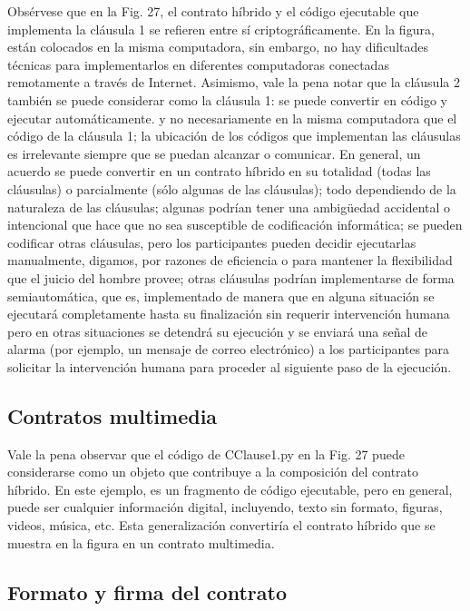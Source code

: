 \documentclass[12pt]{report} %
\begin{document}
\begin{itemize}
Obsérvese que en la Fig. 27, el contrato híbrido y el código ejecutable que implementa la cláusula 1 se refieren entre sí criptográficamente. En la figura, están colocados en la misma computadora, sin embargo, no hay dificultades técnicas para implementarlos en diferentes computadoras conectadas remotamente a través de Internet. Asimismo, vale la pena notar que la cláusula 2 también se puede considerar como la cláusula 1: se puede convertir en código y ejecutar automáticamente. y no necesariamente en la misma computadora que el código de la cláusula 1; la ubicación de los códigos que implementan las cláusulas es irrelevante siempre que se puedan alcanzar o comunicar. En general, un acuerdo se puede convertir en un contrato híbrido en su totalidad (todas las cláusulas) o parcialmente (sólo algunas de las cláusulas); todo dependiendo de la naturaleza de las cláusulas; algunas podrían tener una ambigüedad accidental o intencional que hace que no sea susceptible de codificación informática; se pueden codificar otras cláusulas, pero los participantes pueden decidir ejecutarlas manualmente, digamos, por razones de eficiencia o para mantener la flexibilidad que el juicio del hombre provee; otras cláusulas podrían implementarse de forma semiautomática, que es, implementado de manera que en alguna situación se ejecutará completamente hasta su finalización sin requerir intervención humana pero en otras situaciones se detendrá su ejecución y se enviará una señal de alarma (por ejemplo, un mensaje de correo electrónico) a los participantes para solicitar la intervención humana para proceder al siguiente paso de la ejecución.

\subsection{Contratos multimedia}

Vale la pena observar que el código de CClause1.py en la Fig. 27 puede considerarse como un objeto que contribuye a la composición del contrato híbrido. En este ejemplo, es un fragmento de código ejecutable, pero en general, puede ser cualquier información digital, incluyendo, texto sin formato, figuras, videos, música, etc. Esta generalización convertiría el contrato híbrido que se muestra en la figura en un contrato multimedia.

\subsection{Formato y firma del contrato}


\end{itemize}
\end{document}
